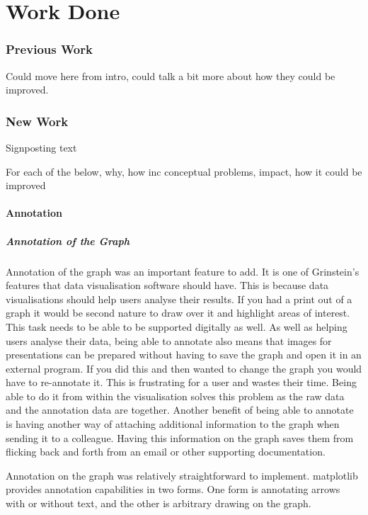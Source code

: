 \chapter{Work Done}

\subsection{Previous Work}
Could move here from intro, could talk a bit more about how they could be improved.

\subsection{New Work}

Signposting text

For each of the below, why, how inc conceptual problems, impact, how it could be improved

\subsubsection{Annotation}

\paragraph{Annotation of the Graph}

Annotation of the graph was an important feature to add.  It is one of Grinstein's features that data visualisation software should have.  This is because data visualisations should help users analyse their results.  If you had a print out of a graph it would be second nature to draw over it and highlight areas of interest.  This task needs to be able to be supported digitally as well.  As well as helping users analyse their data, being able to annotate also means that images for presentations can be prepared without having to save the graph and open it in an external program.  If you did this and then wanted to change the graph you would have to re-annotate it.  This is frustrating for a user and wastes their time.  Being able to do it from within the visualisation solves this problem as the raw data and the annotation data are together.  Another benefit of being able to annotate is having another way of attaching additional information to the graph when sending it to a colleague. Having this information on the graph saves them from flicking back and forth from an email or other supporting documentation.

Annotation on the graph was relatively straightforward to implement.  matplotlib provides annotation capabilities in two forms.  One form is annotating arrows with or without text, and the other is arbitrary drawing on the graph.

